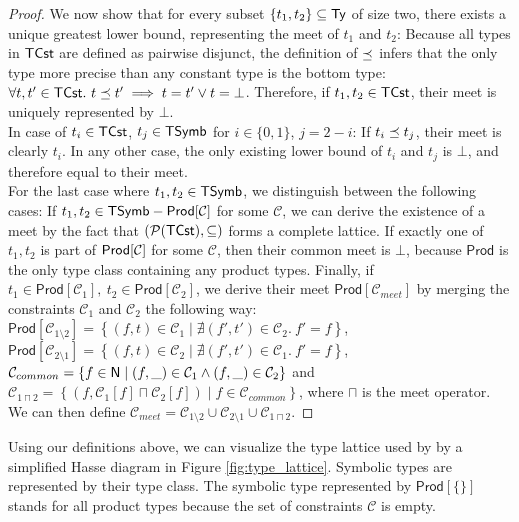 \begin{proof}
	We now show that for every subset $\{t_1, t_2\} \subseteq \mathsf{Ty}$ of size two, there exists a unique greatest lower bound, representing the meet of $t_1$ and $t_2$: Because all types in $\mathsf{TCst}$ are defined as pairwise disjunct, the definition of $\preceq$ infers that the only type more precise than any constant type is the bottom type: $\forall t, t' \in \mathsf{TCst} .\ t \preceq t' \implies t = t' \lor t = \bot$. Therefore, if $t_1, t_2 \in \mathsf{TCst}$, their meet is uniquely represented by $\bot$. \\
	In case of $t_i \in \mathsf{TCst}$, $t_{j} \in \mathsf{TSymb}$ for $i \in \{0, 1\}$, $j = 2 - i$: If $t_i \preceq t_j$, their meet is clearly $t_i$. In any other case, the only existing lower bound of $t_i$ and $t_j$ is $\bot$, and therefore equal to their meet.\\
	For the last case where $t_1, t_2 \in \mathsf{TSymb}$, we distinguish between the following cases: If $t_1, t_2 \in \mathsf{TSymb} - \mathsf{Prod[\mathcal{C}]}$ for some $\mathcal{C}$, we can derive the existence of a meet by the fact that $\left(\mathcal{P}(\mathsf{TCst}), \subseteq \right)$ forms a complete lattice. If exactly one of $t_1, t_2$ is part of $\mathsf{Prod[\mathcal{C}]}$ for some $\mathcal{C}$, then their common meet is $\bot$, because $\mathsf{Prod}$ is the only type class containing any product types. Finally, if $t_1 \in \mathsf{Prod}[\mathcal{C}_1],\ t_2 \in \mathsf{Prod}[\mathcal{C}_2]$, we derive their meet $\mathsf{Prod}[\mathcal{C}_{meet}]$ by merging the constraints $\mathcal{C}_1$ and $\mathcal{C}_2$ the following way: $\mathsf{Prod}[\mathcal{C}_{1 \setminus 2}] = \left\{ (f, t) \in \mathcal{C}_1 \mid \nexists (f', t') \in \mathcal{C}_2 .\ f' = f \right\}$, $\mathsf{Prod}[\mathcal{C}_{2 \setminus 1}] = \left\{ (f, t) \in \mathcal{C}_2 \mid \nexists (f', t') \in \mathcal{C}_1 .\ f' = f \right\}$, $\mathcal{C}_{common} = \left\{ f \in \mathsf{N} \mid (f, \_) \in \mathcal{C}_1 \land (f, \_) \in \mathcal{C}_2 \right\}$ and $\mathcal{C}_{1 \sqcap 2} = \left\{ \left( f, \mathcal{C}_1[f] \sqcap \mathcal{C}_2[f] \right) \mid f \in \mathcal{C}_{common} \right\}$, where $\sqcap$ is the meet operator. We can then define $\mathcal{C}_{meet} = \mathcal{C}_{1 \setminus 2} \cup \mathcal{C}_{2 \setminus 1} \cup \mathcal{C}_{1 \sqcap 2}$.
\end{proof}

Using our definitions above, we can visualize the type lattice used by \MonPoly by a simplified Hasse diagram in Figure \ref{fig:type_lattice}. Symbolic types are represented by their type class. The symbolic type represented by $\mathsf{Prod[\{\}]}$ stands for all product types because the set of constraints $\mathcal{C}$ is empty.

